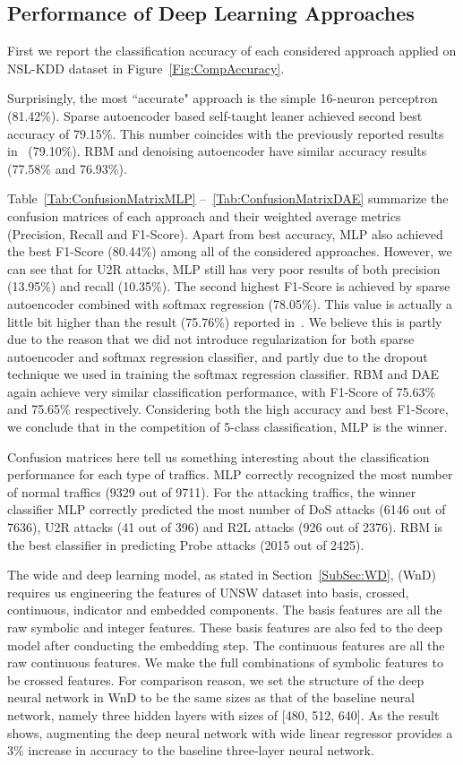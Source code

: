 \subsection{Performance of Deep Learning Approaches}
First we report the classification accuracy of each considered approach
applied on NSL-KDD dataset in Figure~\ref{Fig:CompAccuracy}.

Surprisingly, the most ``accurate" approach is the simple 16-neuron perceptron (81.42\%).
Sparse autoencoder based self-taught leaner achieved second best accuracy of 79.15\%.
This number coincides with the previously reported results in~\cite{STL-NIDS} (79.10\%).
RBM and denoising autoencoder have similar accuracy results (77.58\% and 76.93\%).


Table~\ref{Tab:ConfusionMatrixMLP} --~\ref{Tab:ConfusionMatrixDAE} summarize the confusion matrices
of each approach and their weighted average metrics (Precision, Recall and F1-Score).
Apart from best accuracy, MLP also achieved the best F1-Score (80.44\%)
among all of the considered approaches.
However, we can see that for U2R attacks, MLP still has very poor results of
both precision (13.95\%) and recall (10.35\%).
The second highest F1-Score is achieved by sparse autoencoder combined with softmax regression (78.05\%).
This value is actually a little bit higher than the result (75.76\%) reported in~\cite{STL-NIDS}.
We believe this is partly due to the reason that we did not introduce regularization
for both sparse autoencoder and softmax regression classifier,
and partly due to the dropout technique we used in training the softmax regression classifier.
RBM and DAE again achieve very similar classification performance,
with F1-Score of 75.63\% and 75.65\% respectively.
Considering both the high accuracy and best F1-Score, we conclude that in the competition of
5-class classification, MLP is the winner.

Confusion matrices here tell us something interesting about the classification performance
for each type of traffics.
MLP correctly recognized the most number of normal traffics (9329 out of 9711).
For the attacking traffics, the winner classifier MLP correctly predicted the most
number of DoS attacks (6146 out of 7636), U2R attacks (41 out of 396)
and R2L attacks (926 out of 2376).
RBM is the best classifier in predicting Probe attacks (2015 out of 2425).

The wide and deep learning model, as stated in Section~\ref{SubSec:WD},
(WnD) requires us engineering the features of UNSW dataset into
basis, crossed, continuous, indicator and embedded components.
The basis features are all the raw symbolic and integer features.
These basis features are also fed to the deep model after conducting the embedding step.
The continuous features are all the raw continuous features.
We make the full combinations of symbolic features to be crossed features.
For comparison reason, we set the structure of the deep neural network in WnD to be
the same sizes as that of the baseline neural network,
namely three hidden layers with sizes of [480, 512, 640].
As the result shows, augmenting the deep neural network with wide linear regressor
provides a 3\% increase in accuracy to the baseline three-layer neural network.

